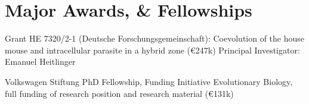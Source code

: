 \documentclass[10pt,a4paper]{article}
\renewenvironment{itemize}{
  \begin{list}{}{
    \setlength{\leftmargin}{2.5em}
    \setlength{\itemsep}{0.25em}
    \setlength{\parskip}{0pt}
    \setlength{\parsep}{0.25em}
  }
}{
  \end{list}
}
\begin{document}
\section*{Major Awards, \& Fellowships}
\begin{itemize}
\item[2015] Grant HE 7320/2-1 (Deutsche Forschungsgemeinschaft):
  Coevolution of the house mouse and intracellular parasite in a
  hybrid zone (\euro 247k) Principal Investigator: Emanuel
  Heitlinger
\item [2008] Volkswagen Stiftung PhD Fellowship, Funding Initiative
  Evolutionary Biology, full funding of research position and research
  material (\euro 131k)
\end{itemize}



\end{document}
